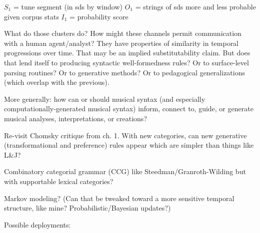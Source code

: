 
$S_1$ = tune segment (in sds by window)
$O_1$ = strings of sds more and less probable given corpus stats
$I_1$ = probability score


What do those clusters do?  How might these channels permit communication with a human agent/analyst?  They have properties of similarity in temporal progressions over time.  That may be an implied substitutability claim.  But does that lend itself to producing syntactic well-formedness rules?  Or to surface-level parsing routines?  Or to generative methods?  Or to pedagogical generalizations (which overlap with the previous).

More generally: how can or should musical syntax (and especially computationally-generated musical syntax) inform, connect to, guide, or generate musical analyses, interpretations, or creations?

Re-visit Chomsky critique from ch. 1.  With new categories, can new generative (transformational and preference) rules appear which are simpler than things like L\&J?

Combinatory categorial grammar (CCG) like Steedman/Granroth-Wilding but with supportable lexical categories?

Markov modeling?  (Can that be tweaked toward a more sensitive temporal structure, like mine?  Probabilistic/Bayesian updates?)

Possible deployments: 






